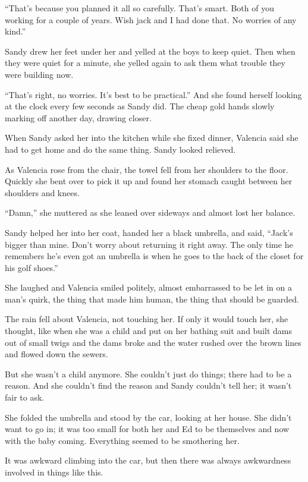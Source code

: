 \documentclass[
]{article}
\begin{document}
``That's because you planned it all so carefully. That's smart. Both of
you working for a couple of years. Wish jack and I had done that. No
worries of any kind.''

Sandy drew her feet under her and yelled at the boys to keep quiet. Then
when they were quiet for a minute, she yelled again to ask them what
trouble they were building now.

``That's right, no worries. It's best to be practical.'' And she found
herself looking at the clock every few seconds as Sandy did. The cheap
gold hands slowly marking off another day, drawing closer.

When Sandy asked her into the kitchen while she fixed dinner, Valencia
said she had to get home and do the same thing. Sandy looked relieved.

As Valencia rose from the chair, the towel fell from her shoulders to
the floor. Quickly she bent over to pick it up and found her stomach
caught between her shoulders and knees.

``Damn,'' she muttered as she leaned over sideways and almost lost her
balance.

Sandy helped her into her coat, handed her a black umbrella, and said,
``Jack's bigger than mine. Don't worry about returning it right away.
The only time he remembers he's even got an umbrella is when he goes to
the back of the closet for his golf shoes.''

She laughed and Valencia smiled politely, almost embarrassed to be let
in on a man's quirk, the thing that made him human, the thing that
should be guarded.

The rain fell about Valencia, not touching her. If only it would touch
her, she thought, like when she was a child and put on her bathing suit
and built dams out of small twigs and the dams broke and the water
rushed over the brown lines and flowed down the sewers.

But she wasn't a child anymore. She couldn't just do things; there had
to be a reason. And she couldn't find the reason and Sandy couldn't tell
her; it wasn't fair to ask.

She folded the umbrella and stood by the car, looking at her house. She
didn't want to go in; it was too small for both her and Ed to be
themselves and now with the baby coming. Everything seemed to be
smothering her.

It was awkward climbing into the car, but then there was always
awkwardness involved in things like this.
\end{document}
